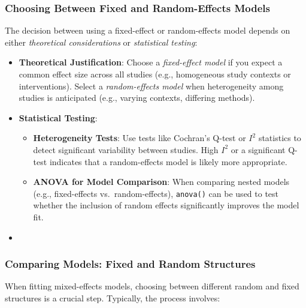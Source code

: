 \documentclass[
]{book}
\providecommand{\tightlist}{%
  \setlength{\itemsep}{0pt}\setlength{\parskip}{0pt}}
\begin{document}
\subsubsection{\texorpdfstring{\textbf{Choosing Between Fixed and Random-Effects Models}}{Choosing Between Fixed and Random-Effects Models}}\label{choosing-between-fixed-and-random-effects-models}

The decision between using a fixed-effect or random-effects model depends on either \emph{theoretical considerations} or \emph{statistical testing}:

\begin{itemize}
\item
  \textbf{Theoretical Justification}: Choose a \emph{fixed-effect model} if you expect a common effect size across all studies (e.g., homogeneous study contexts or interventions). Select a \emph{random-effects model} when heterogeneity among studies is anticipated (e.g., varying contexts, differing methods).
\item
  \textbf{Statistical Testing}:

  \begin{itemize}
  \tightlist
  \item
    \textbf{Heterogeneity Tests}: Use tests like Cochran's Q-test or \(I^2\) statistics to detect significant variability between studies. High \(I^2\) or a significant Q-test indicates that a random-effects model is likely more appropriate.
  \item
    \textbf{ANOVA for Model Comparison}: When comparing nested models (e.g., fixed-effects vs.~random-effects), \texttt{anova()} can be used to test whether the inclusion of random effects significantly improves the model fit.
  \end{itemize}
\item
\end{itemize}

\subsubsection{\texorpdfstring{\textbf{Comparing Models: Fixed and Random Structures}}{Comparing Models: Fixed and Random Structures}}\label{comparing-models-fixed-and-random-structures}

When fitting mixed-effects models, choosing between different random and fixed structures is a crucial step. Typically, the process involves:
\end{document}
